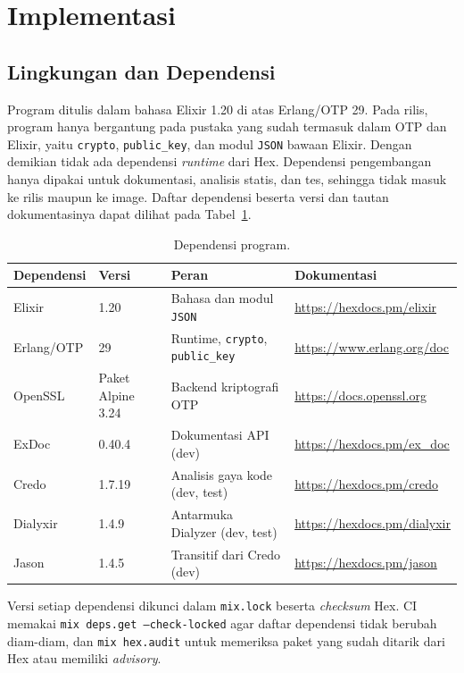 \section{Implementasi}

\subsection{Lingkungan dan Dependensi}
Program ditulis dalam bahasa Elixir 1.20 di atas Erlang/OTP 29. Pada rilis, program hanya
bergantung pada pustaka yang sudah termasuk dalam OTP dan Elixir, yaitu \texttt{crypto},
\texttt{public\_key}, dan modul \texttt{JSON} bawaan Elixir. Dengan demikian tidak ada dependensi
\textit{runtime} dari Hex. Dependensi pengembangan hanya dipakai untuk dokumentasi, analisis statis,
dan tes, sehingga tidak masuk ke rilis maupun ke image. Daftar dependensi beserta versi dan tautan
dokumentasinya dapat dilihat pada Tabel~\ref{tab:dependensi}.

\begin{table}[H]
\centering
{\small
\begin{tabular}{@{}p{3.4cm}p{2.2cm}p{4.2cm}p{4.6cm}@{}}
\toprule
Dependensi & Versi & Peran & Dokumentasi \\
\midrule
Elixir & 1.20 & Bahasa dan modul \texttt{JSON} & \url{https://hexdocs.pm/elixir} \\
Erlang/OTP & 29 & Runtime, \texttt{crypto}, \texttt{public\_key} & \url{https://www.erlang.org/doc} \\
OpenSSL & Paket Alpine 3.24 & Backend kriptografi OTP & \url{https://docs.openssl.org} \\
ExDoc & 0.40.4 & Dokumentasi API (dev) & \url{https://hexdocs.pm/ex_doc} \\
Credo & 1.7.19 & Analisis gaya kode (dev, test) & \url{https://hexdocs.pm/credo} \\
Dialyxir & 1.4.9 & Antarmuka Dialyzer (dev, test) & \url{https://hexdocs.pm/dialyxir} \\
Jason & 1.4.5 & Transitif dari Credo (dev) & \url{https://hexdocs.pm/jason} \\
\bottomrule
\end{tabular}}
\caption{Dependensi program.}
\label{tab:dependensi}
\end{table}

Versi setiap dependensi dikunci dalam \texttt{mix.lock} beserta \textit{checksum} Hex. CI memakai
\texttt{mix deps.get --check-locked} agar daftar dependensi tidak berubah diam-diam, dan
\texttt{mix hex.audit} untuk memeriksa paket yang sudah ditarik dari Hex atau memiliki
\textit{advisory}.

